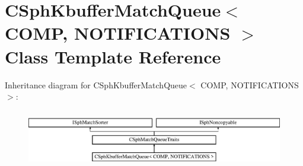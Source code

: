 \hypertarget{classCSphKbufferMatchQueue}{\section{C\-Sph\-Kbuffer\-Match\-Queue$<$ C\-O\-M\-P, N\-O\-T\-I\-F\-I\-C\-A\-T\-I\-O\-N\-S $>$ Class Template Reference}
\label{classCSphKbufferMatchQueue}
}
Inheritance diagram for C\-Sph\-Kbuffer\-Match\-Queue$<$ C\-O\-M\-P, N\-O\-T\-I\-F\-I\-C\-A\-T\-I\-O\-N\-S $>$\-:\begin{figure}[H]
\begin{center}
\leavevmode
\includegraphics[height=2.530120cm]{classCSphKbufferMatchQueue}
\end{center}
\end{figure}
